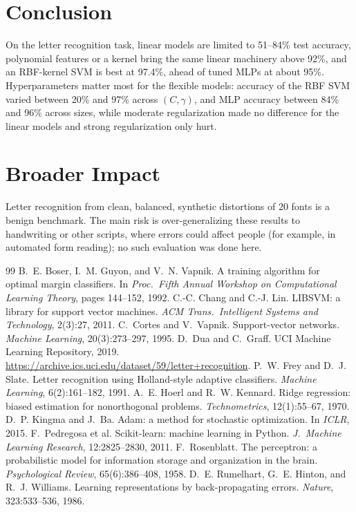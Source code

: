 \documentclass{article}
\begin{document}
\section{Conclusion}
On the letter recognition task, linear models are limited to 51--84\% test accuracy, polynomial features or a kernel bring the same linear machinery above 92\%, and an RBF-kernel SVM is best at 97.4\%, ahead of tuned MLPs at about 95\%. Hyperparameters matter most for the flexible models: accuracy of the RBF SVM varied between 20\% and 97\% across $(C,\gamma)$, and MLP accuracy between 84\% and 96\% across sizes, while moderate regularization made no difference for the linear models and strong regularization only hurt.

\section*{Broader Impact}
Letter recognition from clean, balanced, synthetic distortions of 20 fonts is a benign benchmark. The main risk is over-generalizing these results to handwriting or other scripts, where errors could affect people (for example, in automated form reading); no such evaluation was done here.

\small

\begin{thebibliography}{99}
 B.~E. Boser, I.~M. Guyon, and V.~N. Vapnik. A training algorithm for optimal margin classifiers. In \emph{Proc.\ Fifth Annual Workshop on Computational Learning Theory}, pages 144--152, 1992.
 C.-C. Chang and C.-J. Lin. LIBSVM: a library for support vector machines. \emph{ACM Trans.\ Intelligent Systems and Technology}, 2(3):27, 2011.
 C.~Cortes and V.~Vapnik. Support-vector networks. \emph{Machine Learning}, 20(3):273--297, 1995.
 D.~Dua and C.~Graff. UCI Machine Learning Repository, 2019. \url{https://archive.ics.uci.edu/dataset/59/letter+recognition}.
 P.~W. Frey and D.~J. Slate. Letter recognition using Holland-style adaptive classifiers. \emph{Machine Learning}, 6(2):161--182, 1991.
 A.~E. Hoerl and R.~W. Kennard. Ridge regression: biased estimation for nonorthogonal problems. \emph{Technometrics}, 12(1):55--67, 1970.
 D.~P. Kingma and J.~Ba. Adam: a method for stochastic optimization. In \emph{ICLR}, 2015.
 F.~Pedregosa et al. Scikit-learn: machine learning in Python. \emph{J.\ Machine Learning Research}, 12:2825--2830, 2011.
 F.~Rosenblatt. The perceptron: a probabilistic model for information storage and organization in the brain. \emph{Psychological Review}, 65(6):386--408, 1958.
 D.~E. Rumelhart, G.~E. Hinton, and R.~J. Williams. Learning representations by back-propagating errors. \emph{Nature}, 323:533--536, 1986.
\end{thebibliography}
\end{document}
